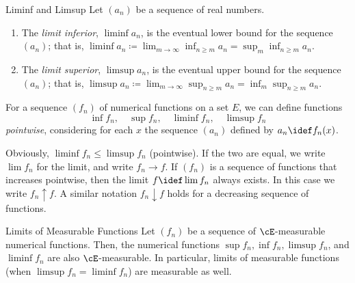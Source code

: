 \begin{defn}{Liminf and Limsup}{}
	Let \((a_n)\) be a sequence of real numbers.
	\begin{enumerate}
		\item The \textit{limit inferior}, \(\liminf a_n\), is the eventual lower bound for the sequence \((a_n)\); that is, \(\liminf a_n \coloneqq \lim_{m \to \infty} \inf_{n \ge m} a_n = \sup_m \inf_{n \ge m} a_n\).
		\item The \textit{limit superior}, \(\limsup a_n\), is the eventual upper bound for the sequence \((a_n)\); that is, \(\limsup a_n \coloneqq \lim_{m \to \infty} \sup_{n \ge m} a_n = \inf_m \sup_{n \ge m} a_n\).
	\end{enumerate}
\end{defn}

For a sequence \((f_n)\) of numerical functions on a set \(E\), we can define functions
\begin{equation*}
	\inf f_n, \quad \sup f_n, \quad \liminf f_n, \quad \limsup f_n
\end{equation*}
\textit{pointwise}, considering for each \(x\) the sequence \((a_n)\) defined by \(a_n \idef f_n(x)\).

Obviously, \(\liminf f_n \le \limsup f_n\) (pointwise). If the two are equal, we write \(\lim f_n\) for the limit, and write \(f_n \to f\). If \((f_n)\) is a sequence of functions that increases pointwise, then the limit \(f \idef \lim f_n\) always exists. In this case we write \(f_n \uparrow f\). A similar notation \(f_n \downarrow f\) holds for a decreasing sequence of functions.

\begin{prop}{Limits of Measurable Functions}{}
	Let \((f_n)\) be a sequence of \(\cE\)-measurable numerical functions. Then, the numerical functions \(\sup f_n, \inf f_n, \limsup f_n\), and \(\liminf f_n\) are also \(\cE\)-measurable. In particular, limits of measurable functions (when \(\limsup f_n = \liminf f_n\)) are measurable as well.
\end{prop}

